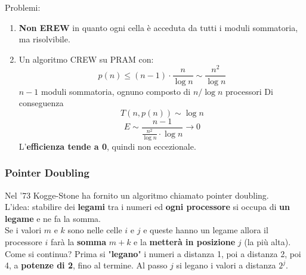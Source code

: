 Problemi: 
\begin{enumerate}
	\item \textbf{Non EREW} in quanto ogni cella è acceduta da tutti i moduli sommatoria, ma risolvibile.\\
	
	\item Un algoritmo CREW su PRAM con: 
	$$ p(n) \leq (n-1) \cdot \frac{n}{\log n} \sim \frac{n^2}{\log n} $$
	$n-1$ moduli sommatoria, ognuno composto di $n/\log n$ processori Di conseguenza
	$$ T(n, p(n)) \sim \log n $$
	$$ E \sim \frac{n-1}{\frac{n^2}{\log n} \cdot \log n} \rightarrow 0$$
	L'\textbf{efficienza tende a 0}, quindi non eccezionale.\\
\end{enumerate}


\newpage

\subsubsection{Pointer Doubling}
Nel '73 Kogge-Stone ha fornito un algoritmo chiamato pointer doubling.\\

L'idea: stabilire dei \textbf{legami} tra i numeri ed \textbf{ogni processore} si occupa di \textbf{un legame} e ne fa la somma.  \\
Se i valori $m$ e $k$ sono nelle celle $i$ e $j$ e queste hanno un legame allora il processore $i$ farà la \textbf{somma} $m+k$ e la \textbf{metterà in posizione} $j$ (la più alta).\\

Come si continua? Prima si "\textbf{legano}" i numeri a distanza 1, poi a distanza 2, poi 4, a \textbf{potenze di 2}, fino al termine. Al passo $j$ si legano i valori a distanza $2^j$.\\

